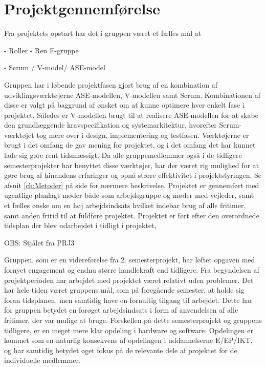\section{Projektgennemførelse} \label{ch:Projektgennemfoerelse}


Fra projektets opstart har det i gruppen været et fælles mål at   



- Roller
- Ren E-gruppe

- Scrum / V-model/ ASE-model 

Gruppen har i løbende projektfasen gjort brug af en kombination af udviklingsværktøjerne ASE-modellen, V-modellen samt Scrum. 
Kombinationen af disse er valgt på baggrund af ønsket om at kunne optimere hver enkelt fase i projektet.
Således er V-modellen brugt til at realisere ASE-modellen for at skabe den grundlæggende kravspecifikation og systemarkitektur, hvorefter Scrum-værktøjet tog mere over i design, implementering og testfasen. 
Værktøjerne er brugt i det omfang de gav mening for projektet, og i det omfang det har kunnet lade sig gøre rent tidsmæssigt. 
Da alle gruppemedlemmer også i de tidligere semesterprojekter har benyttet disse værktøjer, har der været rig mulighed for at gøre brug af hinandens erfaringer og opnå større effektivitet i projektstyringen. 
Se afsnit \ref{ch:Metoder}  på side \pageref{ch:Metoder} for nærmere beskrivelse. 
Projektet er gennemført med ugentlige planlagt møder både som arbejdsgruppe og møder med vejleder, samt et fælles ønske om en høj arbejdsindsats hvilket indebar brug af alle fritimer, samt anden fritid til at fuldføre projektet. Projektet er ført efter den overordnede tidsplan der blev udarbejdet i tidligt i projektet, \cite{lib:Tidsplan}


OBS: Stjålet fra PRJ3

Gruppen, som er en videreførelse fra 2. semesterprojekt, har løftet opgaven med fornyet engagement og endnu større handlekraft end tidligere. Fra begyndelsen af projektperioden har arbejdet med projektet været relativt uden problemer. Det har hele tiden været gruppens mål, som på foregående semester, at holde sig foran tidsplanen\cite{lib:Tidsplan}, men samtidig have en fornuftig tilgang til arbejdet. Dette har for gruppen betydet en forøget arbejdsindsats i form af anvendelsen af alle fritimer, der var mulige at bruge.  
Forskellen på dette semesterprojekt og gruppens tidligere, er en meget mere klar opdeling i hardware og software. Opdelingen er kommet som en naturlig konsekvens af opdelingen i uddannelserne E/EP/IKT, og har samtidig betydet øget fokus på de relevante dele af projektet for de individuelle medlemmer. 

